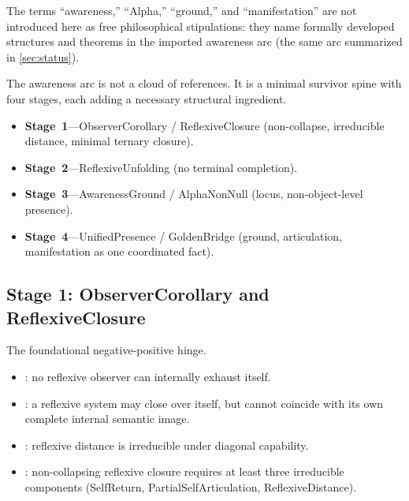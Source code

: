 \documentclass[11pt]{article}
\theoremstyle{plain}
\theoremstyle{definition}
\theoremstyle{remark}
\begin{document}
The terms ``awareness,'' ``Alpha,'' ``ground,'' and ``manifestation'' are
not introduced here as free philosophical stipulations: they name formally
developed structures and theorems in the imported awareness arc (the same
arc summarized in \cref{sec:status}).

The awareness arc is not a cloud of references.  It is a minimal survivor
spine with four stages, each adding a necessary structural ingredient.

\begin{keybox}[title={The four-stage positive spine}]
\begin{itemize}[leftmargin=1.3em,itemsep=0.45em,parsep=0pt,topsep=2pt]
\item \textbf{Stage~1}---ObserverCorollary / ReflexiveClosure (non-collapse,
      irreducible distance, minimal ternary closure).
\item \textbf{Stage~2}---ReflexiveUnfolding (no terminal completion).
\item \textbf{Stage~3}---AwarenessGround / AlphaNonNull (locus, non-object-level presence).
\item \textbf{Stage~4}---UnifiedPresence / GoldenBridge (ground, articulation, manifestation as one coordinated fact).
\end{itemize}
\end{keybox}

\subsection*{Stage 1: ObserverCorollary and ReflexiveClosure}

The foundational negative-positive hinge.
\begin{itemize}[nosep]
\item {}: no reflexive observer can
      internally exhaust itself.
\item {}: a reflexive system may close
      over itself, but cannot coincide with its own complete internal
      semantic image.
\item {}:
      reflexive distance is irreducible under diagonal capability.
\item {}:
      non-collapsing reflexive closure requires at least three
      irreducible components (SelfReturn, PartialSelfArticulation,
      ReflexiveDistance).
\end{itemize}
\end{document}
